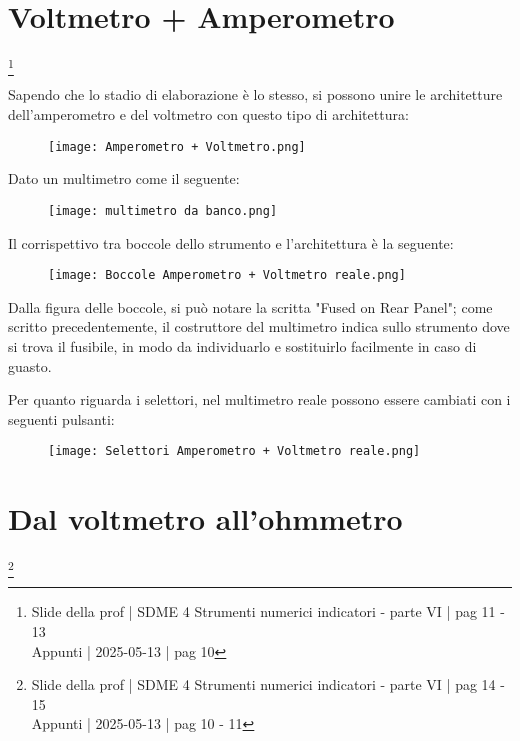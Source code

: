 \newpage 

\section{Voltmetro + Amperometro}
\footnote{Slide della prof | SDME 4 Strumenti numerici indicatori - parte VI | pag 11 - 13 \\  
Appunti | 2025-05-13 | pag 10}

Sapendo che lo stadio di elaborazione è lo stesso, 
si possono unire le architetture dell'amperometro e del voltmetro con questo tipo di architettura: 

\begin{figure}[h]
    \centering
    \texttt{[image: Amperometro + Voltmetro.png]}
\end{figure}

Dato un multimetro come il seguente: 

\begin{figure}[h]
    \centering
    \texttt{[image: multimetro da banco.png]}
\end{figure}

Il corrispettivo tra boccole dello strumento e l'architettura è la seguente: 

\begin{figure}[h]
    \centering
    \texttt{[image: Boccole Amperometro + Voltmetro reale.png]}
\end{figure}

Dalla figura delle boccole, si può notare la scritta "Fused on Rear Panel"; 
come scritto precedentemente, il costruttore del multimetro indica sullo strumento dove si trova il fusibile, 
in modo da individuarlo e sostituirlo facilmente in caso di guasto. \newline 

\newpage 

Per quanto riguarda i selettori, nel multimetro reale possono essere cambiati con i seguenti pulsanti: 

\begin{figure}[h]
    \centering
    \texttt{[image: Selettori Amperometro + Voltmetro reale.png]}
\end{figure}

\newpage 

\section{Dal voltmetro all'ohmmetro}
\footnote{Slide della prof | SDME 4 Strumenti numerici indicatori - parte VI | pag 14 - 15 \\  
Appunti | 2025-05-13 | pag 10 - 11 }

